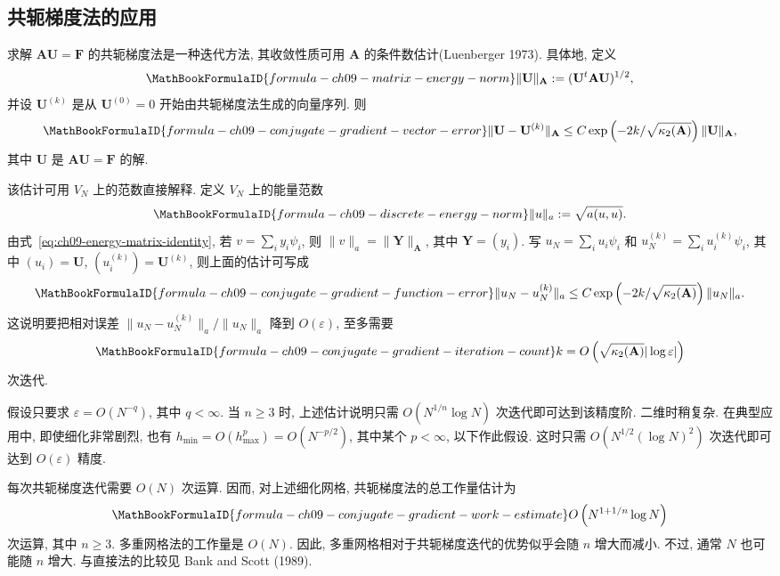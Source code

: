 \subsection{共轭梯度法的应用}
\label{sec:ch09-conjugate-gradient-applications}
\setcounter{thmcount}{0}
\setcounter{equation}{0}

求解 $\mathbf A\mathbf U=\mathbf F$ 的共轭梯度法是一种迭代方法, 其收敛性质可用 $\mathbf A$ 的条件数估计(Luenberger 1973). 具体地, 定义
\[
\MathBookFormulaID{formula-ch09-matrix-energy-norm}
\|\mathbf U\|_{\mathbf A}:=(\mathbf U^t\mathbf A\mathbf U)^{1/2},
\]
并设 $\mathbf U^{(k)}$ 是从 $\mathbf U^{(0)}=0$ 开始由共轭梯度法生成的向量序列. 则
\[
\MathBookFormulaID{formula-ch09-conjugate-gradient-vector-error}
\|\mathbf U-\mathbf U^{(k)}\|_{\mathbf A}
\leq C\exp\left(-2k/\sqrt{\kappa_2(\mathbf A)}\right)\|\mathbf U\|_{\mathbf A},
\]
其中 $\mathbf U$ 是 $\mathbf A\mathbf U=\mathbf F$ 的解.

该估计可用 $V_N$ 上的范数直接解释. 定义 $V_N$ 上的能量范数
\begin{equation}
\MathBookFormulaID{formula-ch09-discrete-energy-norm}
\label{eq:ch09-discrete-energy-norm}
\|u\|_a:=\sqrt{a(u,u)}.
\end{equation}
由式~\eqref{eq:ch09-energy-matrix-identity}, 若 $v=\sum_iy_i\psi_i$, 则 $\|v\|_a=\|\mathbf Y\|_{\mathbf A}$, 其中 $\mathbf Y=(y_i)$. 写 $u_N=\sum_iu_i\psi_i$ 和 $u_N^{(k)}=\sum_iu_i^{(k)}\psi_i$, 其中 $(u_i)=\mathbf U$, $(u_i^{(k)})=\mathbf U^{(k)}$, 则上面的估计可写成
\[
\MathBookFormulaID{formula-ch09-conjugate-gradient-function-error}
\|u_N-u_N^{(k)}\|_a
\leq C\exp\left(-2k/\sqrt{\kappa_2(\mathbf A)}\right)\|u_N\|_a.
\]
这说明要把相对误差 $\|u_N-u_N^{(k)}\|_a/\|u_N\|_a$ 降到 $O(\varepsilon)$, 至多需要
\[
\MathBookFormulaID{formula-ch09-conjugate-gradient-iteration-count}
k=O\left(\sqrt{\kappa_2(\mathbf A)}|\log\varepsilon|\right)
\]
次迭代.

假设只要求 $\varepsilon=O(N^{-q})$, 其中 $q<\infty$. 当 $n\geq3$ 时, 上述估计说明只需 $O(N^{1/n}\log N)$ 次迭代即可达到该精度阶. 二维时稍复杂. 在典型应用中, 即使细化非常剧烈, 也有 $h_{\min}=O(h_{\max}^p)=O(N^{-p/2})$, 其中某个 $p<\infty$, 以下作此假设. 这时只需 $O(N^{1/2}(\log N)^2)$ 次迭代即可达到 $O(\varepsilon)$ 精度.

每次共轭梯度迭代需要 $O(N)$ 次运算. 因而, 对上述细化网格, 共轭梯度法的总工作量估计为
\[
\MathBookFormulaID{formula-ch09-conjugate-gradient-work-estimate}
O\left(N^{1+1/n}\log N\right)
\]
次运算, 其中 $n\geq3$. 多重网格法的工作量是 $O(N)$. 因此, 多重网格相对于共轭梯度迭代的优势似乎会随 $n$ 增大而减小. 不过, 通常 $N$ 也可能随 $n$ 增大. 与直接法的比较见 Bank and Scott (1989).
